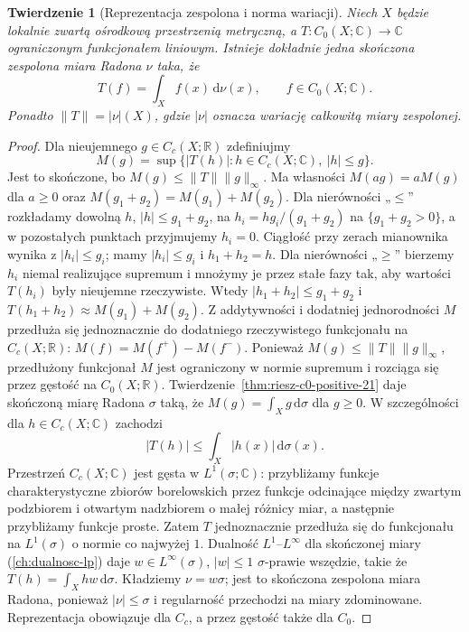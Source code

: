 \documentclass[11pt,a4paper,oneside]{book}
\numberwithin{equation}{chapter}
\theoremstyle{plain}
\newtheorem{twierdzenie}{Twierdzenie}[chapter]
\theoremstyle{definition}
\theoremstyle{remark}
\begin{document}
\begin{twierdzenie}[Reprezentacja zespolona i norma wariacji]
\label{thm:riesz-complex-21}
Niech $X$ będzie lokalnie zwartą ośrodkową przestrzenią
metryczną, a $T:C_0(X;\mathbb C)\to\mathbb C$
ograniczonym funkcjonałem liniowym. Istnieje dokładnie
jedna skończona zespolona miara Radona $\nu$ taka, że
\[
 T(f)=\int_X f(x)\,\mathrm d\nu(x),\qquad f\in C_0(X;\mathbb C).
\]
Ponadto $\|T\|=|\nu|(X)$, gdzie $|\nu|$ oznacza
wariację całkowitą miary zespolonej.
\end{twierdzenie}
\begin{proof}
Dla nieujemnego $g\in C_c(X;\mathbb R)$ zdefiniujmy
\[
 M(g)=\sup\{|T(h)|:h\in C_c(X;\mathbb C),\ |h|\le g\}.
\]
Jest to skończone, bo $M(g)\le\|T\|\|g\|_\infty$.
Ma własności $M(ag)=aM(g)$ dla $a\ge0$ oraz
$M(g_1+g_2)=M(g_1)+M(g_2)$.
Dla nierówności „$\le$” rozkładamy dowolną $h$,
$|h|\le g_1+g_2$, na $h_i=h g_i/(g_1+g_2)$ na
$\{g_1+g_2>0\}$, a w pozostałych punktach przyjmujemy
$h_i=0$. Ciągłość przy zerach mianownika wynika
z $|h_i|\le g_i$; mamy $|h_i|\le g_i$ i
$h_1+h_2=h$. Dla nierówności „$\ge$” bierzemy
$h_i$ niemal realizujące supremum i mnożymy je przez
stałe fazy tak, aby wartości $T(h_i)$ były nieujemne
rzeczywiste. Wtedy $|h_1+h_2|\le g_1+g_2$ i
$T(h_1+h_2)\approx M(g_1)+M(g_2)$.
Z addytywności i dodatniej jednorodności $M$ przedłuża
się jednoznacznie do dodatniego rzeczywistego funkcjonału
na $C_c(X;\mathbb R)$: $M(f)=M(f^+)-M(f^-)$.
Ponieważ $M(g)\le\|T\|\|g\|_\infty$, przedłużony
funkcjonał $M$ jest ograniczony w normie supremum
i rozciąga się przez gęstość na $C_0(X;\mathbb R)$.
Twierdzenie~\ref{thm:riesz-c0-positive-21} daje
skończoną miarę Radona $\sigma$ taką, że
$M(g)=\int_Xg\,\mathrm d\sigma$ dla $g\ge0$.
W szczególności dla $h\in C_c(X;\mathbb C)$ zachodzi
\begin{equation}\label{eq:riesz-domination-21}
 |T(h)|\le \int_X|h(x)|\,\mathrm d\sigma(x).
\end{equation}
Przestrzeń $C_c(X;\mathbb C)$ jest gęsta w
$L^1(\sigma;\mathbb C)$: przybliżamy funkcje charakterystyczne
zbiorów borelowskich przez funkcje odcinające między
zwartym podzbiorem i otwartym nadzbiorem o małej
różnicy miar, a następnie przybliżamy funkcje proste.
Zatem $T$ jednoznacznie przedłuża się do funkcjonału
na $L^1(\sigma)$ o normie co najwyżej $1$.
Dualność $L^1$--$L^\infty$ dla skończonej miary
(\ref{ch:dualnosc-lp}) daje $w\in L^\infty(\sigma)$,
$|w|\le1$ $\sigma$-prawie wszędzie, takie że
$T(h)=\int_X h w\,\mathrm d\sigma$.
Kładziemy $\nu=w\sigma$; jest to skończona zespolona
miara Radona, ponieważ $|\nu|\le\sigma$ i
regularność przechodzi na miary zdominowane.
Reprezentacja obowiązuje dla $C_c$, a przez gęstość
także dla $C_0$.


\end{proof}
\end{document}
